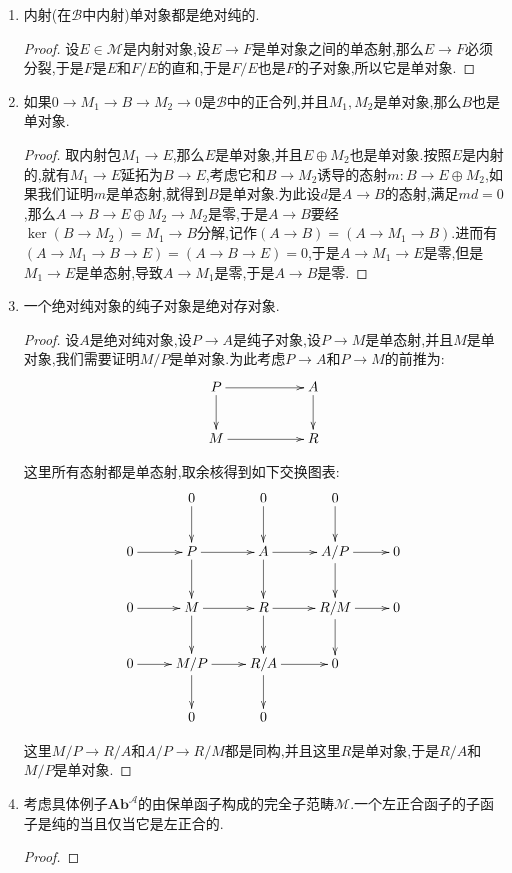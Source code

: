 \begin{enumerate}
	\item 内射(在$\mathscr{B}$中内射)单对象都是绝对纯的.
	\begin{proof}
		
		设$E\in\mathscr{M}$是内射对象,设$E\to F$是单对象之间的单态射,那么$E\to F$必须分裂,于是$F$是$E$和$F/E$的直和,于是$F/E$也是$F$的子对象,所以它是单对象.
	\end{proof}
	\item 如果$0\to M_1\to B\to M_2\to0$是$\mathscr{B}$中的正合列,并且$M_1,M_2$是单对象,那么$B$也是单对象.
	\begin{proof}
		
		取内射包$M_1\to E$,那么$E$是单对象,并且$E\oplus M_2$也是单对象.按照$E$是内射的,就有$M_1\to E$延拓为$B\to E$,考虑它和$B\to M_2$诱导的态射$m:B\to E\oplus M_2$,如果我们证明$m$是单态射,就得到$B$是单对象.为此设$d$是$A\to B$的态射,满足$md=0$,那么$A\to B\to E\oplus M_2\to M_2$是零,于是$A\to B$要经$\ker(B\to M_2)=M_1\to B$分解,记作$\left(A\to B\right)=\left(A\to M_1\to B\right)$.进而有$\left(A\to M_1\to B\to E\right)=\left(A\to B\to E\right)=0$,于是$A\to M_1\to E$是零,但是$M_1\to E$是单态射,导致$A\to M_1$是零,于是$A\to B$是零.
	\end{proof}
	\item 一个绝对纯对象的纯子对象是绝对存对象.
	\begin{proof}
		
		设$A$是绝对纯对象,设$P\to A$是纯子对象,设$P\to M$是单态射,并且$M$是单对象,我们需要证明$M/P$是单对象.为此考虑$P\to A$和$P\to M$的前推为:
		$$\xymatrix{P\ar[rr]\ar[d]&&A\ar[d]\\M\ar[rr]&&R}$$
		
		这里所有态射都是单态射,取余核得到如下交换图表:
		$$\xymatrix{&0\ar[d]&0\ar[d]&0\ar[d]&\\0\ar[r]&P\ar[r]\ar[d]&A\ar[r]\ar[d]&A/P\ar[r]\ar[d]&0\\0\ar[r]&M\ar[r]\ar[d]&R\ar[r]\ar[d]&R/M\ar[d]\ar[r]&0\\0\ar[r]&M/P\ar[d]\ar[r]&R/A\ar[d]\ar[r]&0&\\&0&0&&}$$
		
		这里$M/P\to R/A$和$A/P\to R/M$都是同构,并且这里$R$是单对象,于是$R/A$和$M/P$是单对象.
	\end{proof}
	\item 考虑具体例子$\textbf{Ab}^{\mathscr{A}}$的由保单函子构成的完全子范畴$\mathscr{M}$.一个左正合函子的子函子是纯的当且仅当它是左正合的.
	\begin{proof}
		

\end{proof}
\end{enumerate}

